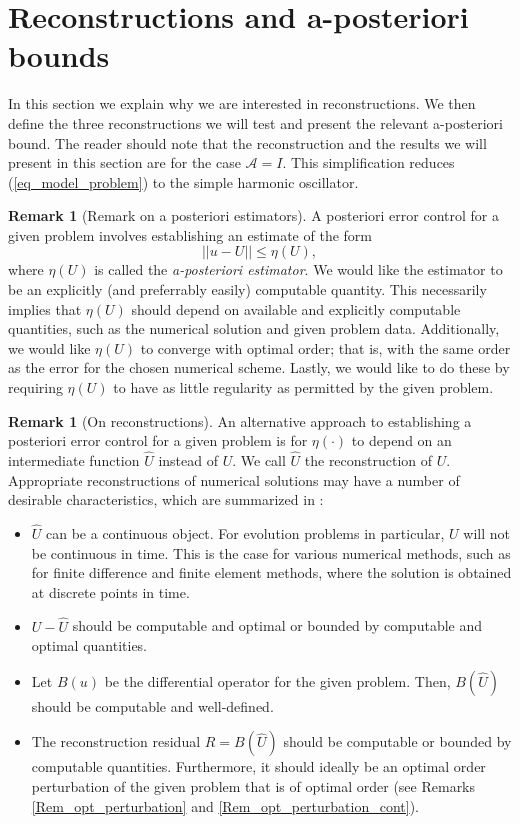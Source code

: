 \documentclass[12pt,a4paper]{article}
\numberwithin{equation}{section}
\theoremstyle{definition}
\newcommand{\qp}[1]{\left(#1\right)}
\newcommand{\rec}[1]{\widehat{{#1}}}
\newcommand{\Normgs}[1]{\left|\left|#1\right|\right|}
\newtheorem{Rem}[subsection]{Remark}
\begin{document}
\section{Reconstructions and a-posteriori bounds}\label{sec_bounds}
In this section we explain why we are interested in reconstructions.  We then define the three reconstructions we will test and  present the relevant a-posteriori bound.  The reader should note that the reconstruction and the results we will present in this section are for the case $\mathcal{A}=I$.  This simplification reduces (\ref{eq_model_problem}) to the simple harmonic oscillator.
\begin{Rem}[Remark on a posteriori estimators]\label{rem_apost_estimator}
 A posteriori error control for a given problem involves establishing an estimate of the form 
\begin{equation}\label{eq_error_estimate}
\Normgs{u-U}\leq \eta\qp{U},
\end{equation}
where $\eta\qp{U}$ is called the\textit{ a-posteriori estimator}.  We would like the estimator to be an explicitly (and preferrably easily) computable quantity.  This necessarily implies that $\eta\qp{U}$ should depend on available and explicitly computable quantities, such as the numerical solution  and given problem data. Additionally, we would like $\eta\qp{U}$ to converge with optimal order; that is, with the same order as the error for the chosen numerical scheme.  Lastly, we would like to do these by requiring $\eta\qp{U}$ to have as little regularity as permitted by the given problem.
\end{Rem}

\begin{Rem}[On reconstructions]
An alternative approach to establishing a posteriori error control for a given problem is for $\eta\qp{\cdot}$ to depend on an intermediate function $\rec{U}$ instead of $U$.   We call $\rec{U}$ the reconstruction of $U$.  Appropriate reconstructions of numerical solutions may have a number of desirable characteristics, which are summarized in \cite{makridakis2007space}:
\begin{itemize}
\item $\rec{U}$ can be a continuous object.  For evolution problems in particular, $U$ will not be continuous in time.  This is the case for various numerical methods, such as for finite difference and finite element methods, where the solution is obtained at discrete points in time.
\item $U-\rec{U}$ should be computable and optimal or bounded by computable and optimal quantities.
\item Let $B\qp{u}$ be the differential operator for the given problem.  Then, $B\qp{\rec{U}}$ should be computable and well-defined.
\item The reconstruction residual $R=B\qp{\rec{U}}$ should be computable or bounded by computable quantities.  Furthermore, it should ideally be an optimal order perturbation of the given problem that is of optimal order (see Remarks \ref{Rem_opt_perturbation} and \ref{Rem_opt_perturbation_cont}).
\end{itemize}
\end{Rem}
\end{document}
